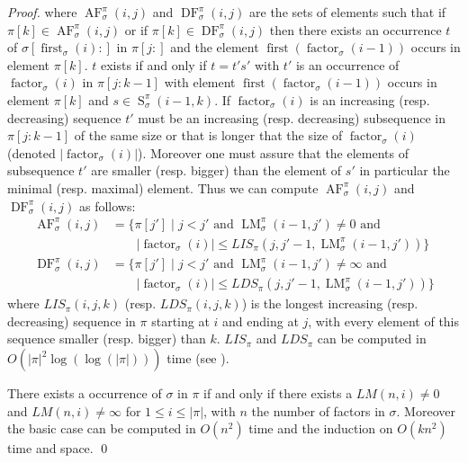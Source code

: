 \documentclass[a4paper]{llncs}
\newcommand{\ptext}{\pi}
\newcommand{\pmotif}{\sigma}
\newcounter{num}
\DeclareMathOperator{\firstia}{first}
\newcommand{\firsti}[2]{\firstia_{{#1}}({#2})}
\DeclareMathOperator{\factora}{factor}
\newcommand{\factor}[2]{\factora_{{#1}}({#2})}
\DeclareMathOperator{\firsta}{first}
\newcommand{\first}[2]{\firsta(\factor{#1}{#2})}
\DeclareMathOperator{\LMa}{LM}
\newcommand{\LM}[4]{\LMa_{{#1}}^{{#2}}(#3,#4)}
\DeclareMathOperator{\AFa}{AF}
\newcommand{\AF}[4]{\AFa_{{#1}}^{{#2}}(#3,#4)}
\DeclareMathOperator{\DFa}{DF}
\newcommand{\DF}[4]{\DFa_{{#1}}^{{#2}}(#3,#4)}
\DeclareMathOperator{\SETa}{S}
\newcommand{\SET}[4]{\SETa_{{#1}}^{{#2}}({#3},{#4})}
\begin{document}
\begin{proof}
where $\AF{\pmotif}{\ptext}{i}{j}$ and $\DF{\pmotif}{\ptext}{i}{j}$ are the sets 
of elements such that if  
$\ptext[k] \in \AF{\pmotif}{\ptext}{i}{j}$ or if $\ptext[k] \in \DF{\pmotif}{\ptext}{i}{j}$ 
then there exists an occurrence $t$ of $\pmotif[\firsti{\pmotif}{i}:]$ in $\ptext[j:]$ and the element 
$\first{\pmotif}{i-1}$ occurs in element $\ptext[k]$. 
$t$ exists if and only if $t=t's'$ with $t'$ is an occurrence of  $\factor{\pmotif}{i}$ in $\ptext[j:k-1]$ with element
$\first{\pmotif}{i-1}$ occurs in element $\ptext[k]$
and $s \in \SET{\pmotif}{\ptext}{i-1}{k}$.
If $\factor{\pmotif}{i}$ is an increasing (resp. decreasing)
sequence $t'$ must be an increasing (resp. decreasing) 
subsequence
in $\ptext[j:k-1]$ of the same size or that is longer that
the size of $\factor{\pmotif}{i}$ (denoted $|\factor{\pmotif}{i}|$).
Moreover one must assure that the elements of subsequence 
$t'$ are smaller (resp. bigger) than the element of $s'$ 
in particular the minimal (resp. maximal) element.
Thus we can compute $\AF{\pmotif}{\ptext}{i}{j}$ and $\DF{\pmotif}{\ptext}{i}{j}$ as follows:
\begin{align*}
\AF{\pmotif}{\ptext}{i}{j}
&=
\text{$\{\ptext[j'] \;|\; j<j'$ and $\LM{\pmotif}{\ptext}{i-1}{j'} \neq 0$ and} 
\\
&\qquad 
\text{$|\factor{\pmotif}{i}| \leq LIS_{\ptext}(j,j'-1,\LM{\pmotif}{\ptext}{i-1}{j'})\}$} 
\\
\DF{\pmotif}{\ptext}{i}{j}
&=
\text{$\{\ptext[j'] \;|\; j<j'$ and $\LM{\pmotif}{\ptext}{i-1}{j'} \neq \infty$ and}
\\
&\qquad
\text{$|\factor{\pmotif}{i}| \leq LDS_{\ptext}(j,j'-1,\LM{\pmotif}{\ptext}{i-1}{j'})\}$}
\end{align*}
where $LIS_{\ptext}(i,j,k)$ (resp. $LDS_{\ptext}(i,j,k)$) is the longest increasing 
(resp. decreasing) sequence in $\ptext$ starting at $i$ and ending at $j$,
with every element of this sequence
smaller (resp. bigger) than $k$.
$LIS_{\ptext}$ and $LDS_{\ptext}$ can be computed in 
$O(|\ptext|^2\log(\log(|\ptext|)))$ time (see \cite{Bespamyatnikh00enumeratinglongest}).

There exists a occurrence of $\pmotif$ in $\ptext$ if and only if
there exists a $LM(n,i)\neq 0$ and $LM(n,i)\neq \infty$ for $1 \leq i \leq |\ptext|$,
with $n$ the number of factors in $\pmotif$.
Moreover the basic case can be computed in $O(n^2)$ time
and the induction on $O(kn^2)$ time and space.
\qed
\end{proof}

\end{document}
